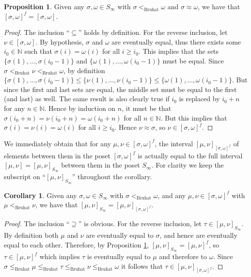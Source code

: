 \documentclass[oneside,11pt,reqno]{amsart}
\newcommand{\nn}{\ensuremath{\mathbb{N}}}
\theoremstyle{definition}
\newtheorem{proof techniques}{Proof Techniques}
\newtheorem{corollary}{Corollary}
\newtheorem{proposition}{Proposition}
\begin{document}
\begin{proposition}\label{prop: ee implies intervals are equal}
    Given any $\sigma , \omega \in S_\infty$ with $\sigma <_\text{Bruhat} \omega$ and $\sigma \approx \omega$, we have that $[\sigma , \omega]^f = [\sigma , \omega]$.
\end{proposition}

\begin{proof}
    The inclusion ``$\subseteq$'' holds by definition. For the reverse inclusion, let $\nu \in [\sigma , \omega]$. By hypothesis, $\sigma$ and $\omega$ are eventually equal, thus there exists some $i_0 \in \nn$ such that $\sigma(i) = \omega(i)$ for all $i \geq i_0$. This implies that the sets $\{ \sigma(1) , \ldots, \sigma(i_0  - 1) \}$ and $\{ \omega(1) , \ldots, \omega(i_0  - 1) \}$ must be equal. Since $\sigma <_\text{Bruhat} \nu <_\text{Bruhat} \omega$, by definition $\{ \sigma(1) , \ldots, \sigma(i_0  - 1) \} \leq \{ \nu(1) , \ldots, \nu(i_0  - 1) \} \leq \{ \omega(1) , \ldots, \omega(i_0  - 1) \}$. But since the first and last sets are equal, the middle set must be equal to the first (and last) as well. The same result is also clearly true if $i_0$ is replaced by $i_0 + n$ for any $n \in \nn$. Hence by induction on $n$, it must be that $\sigma(i_0 + n) = \nu(i_0 + n) = \omega(i_0 + n)$ for all $n \in \nn$. But this implies that $\sigma(i) = \nu(i) = \omega(i)$ for all $i \geq i_0$. Hence $\nu \approx \sigma$, so $\nu \in [\sigma , \omega]^f$. 
\end{proof}

We immediately obtain that for any $\mu , \nu \in [\sigma, \omega]^f$, the interval $[\mu , \nu]_{[\sigma, \omega]^f}$ of elements between them in the poset $[\sigma, \omega]^f$ is actually equal to the full interval $[\mu , \nu] = [\mu , \nu]_{S_\infty}$ between them in the poset $S_\infty$. For clarity we keep the subscript on ``$[\mu , \nu]_{S_\infty}$'' throughout the corollary.  

\begin{corollary}\label{cor: big interval contained in ee interval}
    Given any $\sigma , \omega \in S_\infty$ with $\sigma <_\text{Bruhat} \omega$, and any $\mu , \nu \in [\sigma , \omega]^f$ with $\mu <_\text{Bruhat} \nu$, we have that $[\mu , \nu]_{S_\infty} = [\mu , \nu]_{[\sigma , \omega]^f}$. 
\end{corollary}

\begin{proof}
    The inclusion ``$\supseteq$'' is obvious. For the reverse inclusion, let $\tau \in [\mu , \nu]_{S_\infty}$. By definition both $\mu$ and $\nu$ are eventually equal to $\sigma$, and hence are eventually equal to each other. Therefore, by Proposition \ref{prop: ee implies intervals are equal}, $[\mu , \nu]_{S_\infty} = [\mu , \nu]^f$, so $\tau \in [\mu , \nu]^f$ which implies $\tau$ is eventually equal to $\mu$ and therefore to $\omega$. Since $\sigma \leq_\text{Bruhat} \mu \leq_\text{Bruhat} \tau \leq_\text{Bruhat} \nu \leq_\text{Bruhat} \omega$ it follows that $\tau \in [\mu , \nu]_{[\sigma , \omega]^f}$.
\end{proof}
\end{document}
